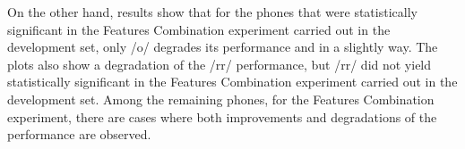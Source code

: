 On the other hand, results show that
for the phones that were statistically significant in the
Features Combination experiment carried out in the development set, only /o/ degrades
its performance and in a slightly way. The plots also show a degradation of the /rr/
performance, but /rr/ did not yield statistically significant
in the Features Combination
experiment carried out in the development set.
Among the remaining phones, for the Features Combination experiment,
there are cases where both improvements
and degradations of the performance are observed.



